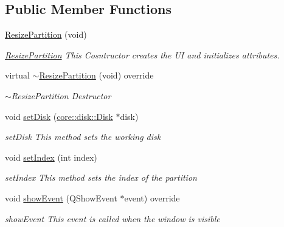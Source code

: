 \subsection*{Public Member Functions}
\begin{DoxyCompactItemize}
\item 
\mbox{\hyperlink{classui_1_1window_1_1_resize_partition_aae9713fef4f920cea006ca9552f02b82}{Resize\+Partition}} (void)
\begin{DoxyCompactList}\small\item\em \mbox{\hyperlink{classui_1_1window_1_1_resize_partition}{Resize\+Partition}} This Cosntructor creates the UI and initializes attributes. \end{DoxyCompactList}\item 
virtual \mbox{\hyperlink{classui_1_1window_1_1_resize_partition_a2e2c8343e7d758f6276ad459424533e9}{$\sim$\+Resize\+Partition}} (void) override
\begin{DoxyCompactList}\small\item\em $\sim$\+Resize\+Partition Destructor \end{DoxyCompactList}\item 
void \mbox{\hyperlink{classui_1_1window_1_1_resize_partition_a1c14acdca1d021b12584b639ac51fc7c}{set\+Disk}} (\mbox{\hyperlink{classcore_1_1disk_1_1_disk}{core\+::disk\+::\+Disk}} $\ast$disk)
\begin{DoxyCompactList}\small\item\em set\+Disk This method sets the working disk \end{DoxyCompactList}\item 
void \mbox{\hyperlink{classui_1_1window_1_1_resize_partition_a0c564d96b48c8c9b134e73184a9f591e}{set\+Index}} (int index)
\begin{DoxyCompactList}\small\item\em set\+Index This method sets the index of the partition \end{DoxyCompactList}\item 
void \mbox{\hyperlink{classui_1_1window_1_1_resize_partition_a3a220945008ce93de147fdf3d8faf486}{show\+Event}} (Q\+Show\+Event $\ast$event) override
\begin{DoxyCompactList}\small\item\em show\+Event This event is called when the window is visible \end{DoxyCompactList}\end{DoxyCompactItemize}
